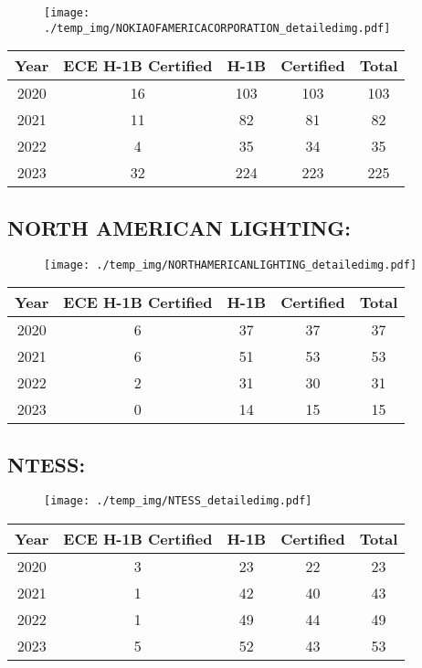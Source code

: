 \documentclass{article}%
\begin{document}
\begin{figure}[htbp]%
\centering%
\texttt{[image: ./temp\_img/NOKIAOFAMERICACORPORATION\_detailedimg.pdf]}%
\end{figure}

%
\begin{longtable}{c|c|c|c|c}%
\hline%
Year&ECE H{-}1B Certified&H{-}1B&Certified&Total\\%
\hline%
2020&16&103&103&103\\%
\hline%
2021&11&82&81&82\\%
\hline%
2022&4&35&34&35\\%
\hline%
2023&32&224&223&225\\%
\hline%
\end{longtable}

%
\newpage%
\subsection{NORTH AMERICAN LIGHTING:}%
\label{subsec:NORTHAMERICANLIGHTING}%
\label{NORTHAMERICANLIGHTINGdetailed}%


\begin{figure}[htbp]%
\centering%
\texttt{[image: ./temp\_img/NORTHAMERICANLIGHTING\_detailedimg.pdf]}%
\end{figure}

%
\begin{longtable}{c|c|c|c|c}%
\hline%
Year&ECE H{-}1B Certified&H{-}1B&Certified&Total\\%
\hline%
2020&6&37&37&37\\%
\hline%
2021&6&51&53&53\\%
\hline%
2022&2&31&30&31\\%
\hline%
2023&0&14&15&15\\%
\hline%
\end{longtable}

%
\newpage%
\subsection{NTESS:}%
\label{subsec:NTESS}%
\label{NTESSdetailed}%


\begin{figure}[htbp]%
\centering%
\texttt{[image: ./temp\_img/NTESS\_detailedimg.pdf]}%
\end{figure}

%
\begin{longtable}{c|c|c|c|c}%
\hline%
Year&ECE H{-}1B Certified&H{-}1B&Certified&Total\\%
\hline%
2020&3&23&22&23\\%
\hline%
2021&1&42&40&43\\%
\hline%
2022&1&49&44&49\\%
\hline%
2023&5&52&43&53\\%
\hline%
\end{longtable}
\end{document}
